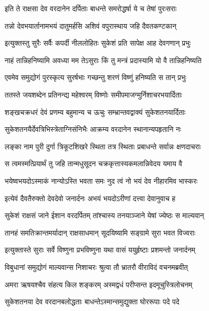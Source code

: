 \twolineshloka
{इति ते राक्षसा देव वरदानेन दर्पिताः}
{बाधन्ते समरोद्धर्षा ये च तेषां पुरःसराः} %

\twolineshloka
{तन्नो देवभयार्तानामभयं दातुमर्हसि}
{अशिवं वपुरास्थाय जहि दैवतकण्टकान्} %

\twolineshloka
{इत्युक्तस्तु सुरैः सर्वैः कपर्दी नीललोहितः}
{सुकेशं प्रति सापेक्ष आह देवगणान् प्रभुः} %

\twolineshloka
{नाहं तान्निहनिष्यामि अवध्या मम तेऽसुराः}
{किं तु मन्त्रं प्रदास्यामि यो वै तान्निहनिष्यति} %

\twolineshloka
{एवमेव समुद्योगं पुरस्कृत्य सुरर्षभाः}
{गच्छन्तु शरणं विष्णुं हनिष्यति स तान् प्रभुः} %

\twolineshloka
{ततस्ते जयशब्देन प्रतिनन्द्य महेश्वरम्}
{विष्णोः समीपमाजग्मुर्निशाचरभयार्दिताः} %

\twolineshloka
{शङ्खचक्रधरं देवं प्रणम्य बहुमान्य च}
{ऊचुः सम्भ्रान्तवद्वाक्यं सुकेशतनयार्दिताः} %

\twolineshloka
{सुकेशतनयैर्देवत्रिभिस्त्रेताग्निसंनिभैः}
{आक्रम्य वरदानेन स्थानान्यपहृतानि नः} %

\twolineshloka
{लङ्का नाम पुरी दुर्गा त्रिकूटशिखरे स्थिता}
{तत्र स्थिताः प्रबाधन्ते सर्वान्नः क्षणदाचराः} %

\twolineshloka
{स त्वमस्मत्प्रियार्थं तु जहि तान्मधुसूदन}
{चक्रकृत्तास्यकमलान्निवेदय यमाय वै} %

\twolineshloka
{भयेष्वभयदोऽस्माकं नान्योऽस्ति भवता समः}
{नुद त्वं नो भयं देव नीहारमिव भास्करः} %

\twolineshloka
{इत्येवं दैवतैरुक्तो देवदेवो जनार्दनः}
{अभयं भयदोऽरीणां दत्त्वा देवानुवाच ह} %

\twolineshloka
{सुकेशं राक्षसं जाने ईशान वरदर्पितम्}
{तांश्चास्य तनयाञ्जाने येषां ज्येष्ठः स माल्यवान्} %

\twolineshloka
{तानहं समतिक्रान्तमर्यादान् राक्षसाधमान्}
{सूदयिष्यामि सङ्ग्रामे सुरा भवत विज्वराः} %

\twolineshloka
{इत्युक्तास्ते सुराः सर्वे विष्णुना प्रभविष्णुना}
{यथा वासं ययुर्हृष्टाः प्रशमन्तो जनार्दनम्} %

\twolineshloka
{विबुधानां समुद्योगं माल्यवान्स निशाचरः}
{श्रुत्वा तौ भ्रातरौ वीराविदं वचनमब्रवीत्} %

\twolineshloka
{अमरा ऋषयश्चैव संहत्य किल शङ्करम्}
{अस्मद्वधं परीप्सन्त इदमूचुस्त्रिलोचनम्} %

\twolineshloka
{सुकेशतनया देव वरदानबलोद्धताः}
{बाधन्तेऽस्मान्समुद्युक्ता घोररूपाः पदे पदे} %

